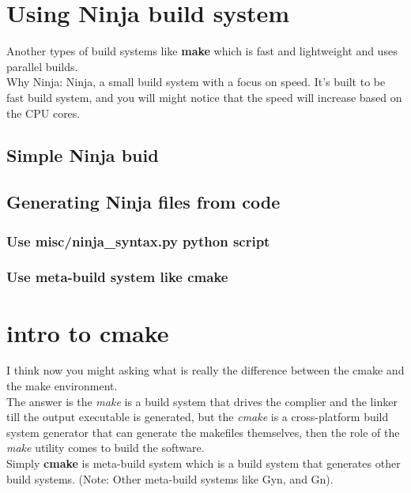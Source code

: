 \documentclass{article}
\begin{document}
\section{Using Ninja build system}
Another types of build systems like \textbf{make} which is fast and lightweight and uses parallel builds.\\

Why Ninja: Ninja, a small build system with a focus on speed. It's built to be fast build system, and you will might notice that the speed will increase based on the CPU cores.

\subsection{Simple Ninja buid}





\subsection{Generating Ninja files from code}
\subsubsection{Use misc/ninja\_syntax.py python script}

\subsubsection{Use meta-build system like cmake}

\section{intro to cmake} 
I think now you might asking what is really the difference between the cmake and the make environment.\\
The answer is the \textit{make} is a build system that drives the complier and the linker till the output executable is generated, but the \textit{cmake} is a cross-platform build system generator that can generate the makefiles themselves, then the role of the \textit{make} utility comes to build the software.\\

Simply \textbf{cmake} is meta-build system which is a build system that generates other build systems. (Note: Other meta-build systems like Gyn, and Gn).\\
\end{document}
